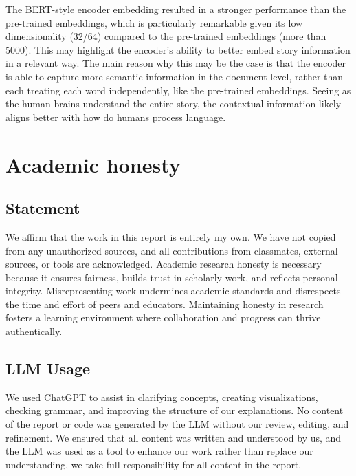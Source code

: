 \documentclass[10pt,letterpaper]{article}
\begin{document}
The BERT-style encoder embedding resulted in a stronger performance than the pre-trained embeddings, which is particularly remarkable given its low dimensionality (32/64) compared to the pre-trained embeddings (more than 5000). This may highlight the encoder's ability to better embed story information in a relevant way. The main reason why this may be the case is that the encoder is able to capture more semantic information in the document level, rather than each treating each word independently, like the pre-trained embeddings. Seeing as the human brains understand the entire story, the contextual information likely aligns better with how do humans process language.
\newpage

\printbibliography

\appendix
\section{Academic honesty}
\subsection{Statement}
We affirm that the work in this report is entirely my own. We have not copied from any unauthorized sources, and all contributions from classmates, external sources, or tools are acknowledged. Academic research honesty is necessary because it ensures fairness, builds trust in scholarly work, and reflects personal integrity. Misrepresenting work undermines academic standards and disrespects the time and effort of peers and educators. Maintaining honesty in research fosters a learning environment where collaboration and progress can thrive authentically.

\subsection{LLM Usage}

We used ChatGPT to assist in clarifying concepts, creating visualizations, checking grammar, and improving the structure of our explanations. No content of the report or code was generated by the LLM without our review, editing, and refinement. We ensured that all content was written and understood by us, and the LLM was used as a tool to enhance our work rather than replace our understanding, we take full responsibility for all content in the report.
\end{document}

